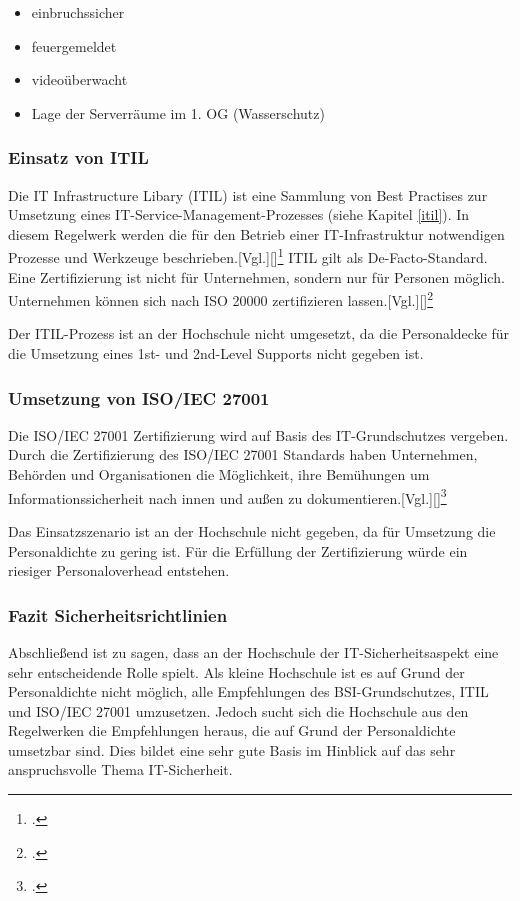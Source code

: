\begin{itemize}
	\item einbruchssicher
	\item feuergemeldet
	\item videoüberwacht
	\item Lage der Serverräume im 1. OG (Wasserschutz)
\end{itemize}

\subsubsection{Einsatz von ITIL}
Die IT Infrastructure Libary (ITIL) ist eine Sammlung von Best Practises zur Umsetzung eines IT-Service-Management-Prozesses (siehe Kapitel \ref{itil}). In diesem Regelwerk werden die für den Betrieb einer IT-Infrastruktur notwendigen Prozesse und Werkzeuge beschrieben.[Vgl.][]\footcite{itil_dxperts.de_2015} ITIL gilt als De-Facto-Standard. Eine Zertifizierung ist nicht für Unternehmen, sondern nur für Personen möglich. Unternehmen können sich nach ISO 20000 zertifizieren lassen.[Vgl.][]\footcite{itil_wirtschaftslexikon.gabler}

Der ITIL-Prozess ist an der Hochschule nicht umgesetzt, da die Personaldecke für die Umsetzung eines 1st- und 2nd-Level Supports nicht gegeben ist.

\subsubsection{Umsetzung von ISO/IEC 27001}
Die ISO/IEC 27001 Zertifizierung wird auf Basis des IT-Grundschutzes vergeben. Durch die Zertifizierung des ISO/IEC 27001 Standards haben Unternehmen, Behörden und Organisationen die Möglichkeit, ihre Bemühungen um Informationssicherheit nach innen und außen zu dokumentieren.[Vgl.][]\footcite{iso_27001_bsi.bund.de_2015}

Das Einsatzszenario ist an der Hochschule nicht gegeben, da für Umsetzung die Personaldichte zu gering ist. Für die Erfüllung der Zertifizierung würde ein riesiger Personaloverhead entstehen.

\subsubsection{Fazit Sicherheitsrichtlinien}
Abschließend ist zu sagen, dass an der Hochschule der IT-Sicherheitsaspekt eine sehr entscheidende Rolle spielt. Als kleine Hochschule ist es auf Grund der Personaldichte nicht möglich, alle Empfehlungen des BSI-Grundschutzes, ITIL und ISO/IEC 27001 umzusetzen. Jedoch sucht sich die Hochschule aus den Regelwerken die Empfehlungen heraus, die auf Grund der Personaldichte umsetzbar sind. Dies bildet eine sehr gute Basis im Hinblick auf das sehr anspruchsvolle Thema IT-Sicherheit.